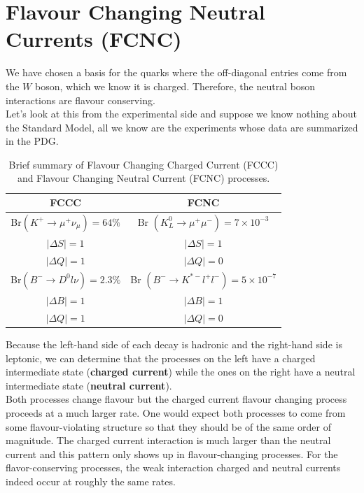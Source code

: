 \documentclass[../main.tex]{subfiles}
\begin{document}
\section{Flavour Changing Neutral Currents (FCNC)}
We have chosen a basis for the quarks where the off-diagonal entries come from the $W$ boson, which we know it is charged. Therefore, the neutral boson interactions are flavour conserving.\\
Let's look at this from the experimental side and suppose we know nothing about the Standard Model, all we know are the experiments whose data are summarized in the PDG\cite{pdg}.
\begin{table}[h]
    \centering
    \begin{tabular}{c|c}
    \hline
    \rowcolor{blue!30}FCCC & FCNC\\
    \hline
    Br$(K^+\xrightarrow[]{}\mu^+\nu_\mu)=64\%$ & Br $(K_L^0\xrightarrow[]{}\mu^+\mu^-)=7\times10^{-3}$\\
    $|\Delta S|=1$ & $|\Delta S|=1$\\
    $|\Delta Q|=1$ & $|\Delta Q|=0$\\
    \hline
    Br$(B^-\xrightarrow[]{}D^0l\nu)=2.3\%$ & Br $(B^-\xrightarrow[]{}K^{*-}l^+l^-)=5\times10^{-7}$\\
    $|\Delta B|=1$ & $|\Delta B|=1$\\
    $|\Delta Q|=1$ & $|\Delta Q|=0$\\
    \hline
    \end{tabular}
    \caption{Brief summary of Flavour Changing Charged Current (FCCC) and Flavour Changing Neutral Current (FCNC) processes.}
\end{table}
\newline
Because the left-hand side of each decay is hadronic and the right-hand side is leptonic, we can determine that the processes on the left have a charged intermediate state (\textbf{charged current}) while the ones on the right have a neutral intermediate state (\textbf{neutral current}).\\
Both processes change flavour but the charged current flavour changing process proceeds at a much larger rate. One would expect both processes to come from some flavour-violating structure so that they should be of the same order of magnitude. The charged current interaction is much larger than the neutral current and this pattern only shows up in flavour-changing processes. For the flavor-conserving processes, the weak interaction charged and neutral currents indeed occur at roughly the same rates.
\end{document}
